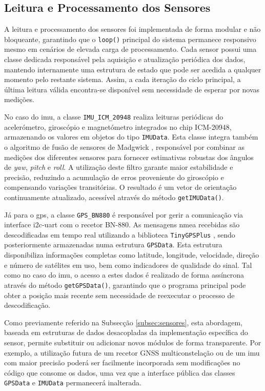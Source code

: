 \subsection{Leitura e Processamento dos Sensores}
\label{subsec:processamento-sensores}

A leitura e processamento dos sensores foi implementada de forma modular e não bloqueante, garantindo que o \texttt{loop()} principal do sistema permanece responsivo mesmo em cenários de elevada carga de processamento. Cada sensor possui uma classe dedicada responsável pela aquisição e atualização periódica dos dados, mantendo internamente uma estrutura de estado que pode ser acedida a qualquer momento pelo restante sistema. Assim, a cada iteração do ciclo principal, a última leitura válida encontra-se disponível sem necessidade de esperar por novas medições.

No caso do \gls{imu}, a classe \texttt{IMU\_ICM\_20948} realiza leituras periódicas do acelerómetro, giroscópio e magnetómetro integrados no chip ICM-20948, armazenando os valores em objetos do tipo \texttt{IMUData}. Esta classe integra também o algoritmo de fusão de sensores de Madgwick \cite{madgwick-filter}, responsável por combinar as medições dos diferentes sensores para fornecer estimativas robustas dos ângulos de \emph{yaw}, \emph{pitch} e \emph{roll}. A utilização deste filtro garante maior estabilidade e precisão, reduzindo a acumulação de erros proveniente do giroscópio e compensando variações transitórias. O resultado é um vetor de orientação continuamente atualizado, acessível através do método \texttt{getIMUData()}.

Já para o \gls{gps}, a classe \texttt{GPS\_BN880} é responsável por gerir a comunicação via interface \gls{i2c}-\gls{uart} com o recetor BN-880. As mensagens \gls{nmea} recebidas são descodificadas em tempo real utilizando a biblioteca \texttt{TinyGPSPlus} \cite{tinygpsplus}, sendo posteriormente armazenadas numa estrutura \texttt{GPSData}. Esta estrutura disponibiliza informações completas como latitude, longitude, velocidade, direção e número de satélites em uso, bem como indicadores de qualidade do sinal. Tal como no caso do \gls{imu}, o acesso a estes dados é realizado de forma assíncrona através do método \texttt{getGPSData()}, garantindo que o programa principal pode obter a posição mais recente sem necessidade de reexecutar o processo de descodificação. 

Como previamente referido na Subsecção \ref{subsec:sensores}, esta abordagem, baseada em estruturas de dados desacopladas da implementação específica do sensor, permite substituir ou adicionar novos módulos de forma transparente. Por exemplo, a utilização futura de um recetor GNSS multiconstelação ou de um \gls{imu} com maior precisão poderá ser facilmente incorporada sem modificações no código que consome os dados, uma vez que a interface pública das classes \texttt{GPSData} e \texttt{IMUData} permanecerá inalterada.

